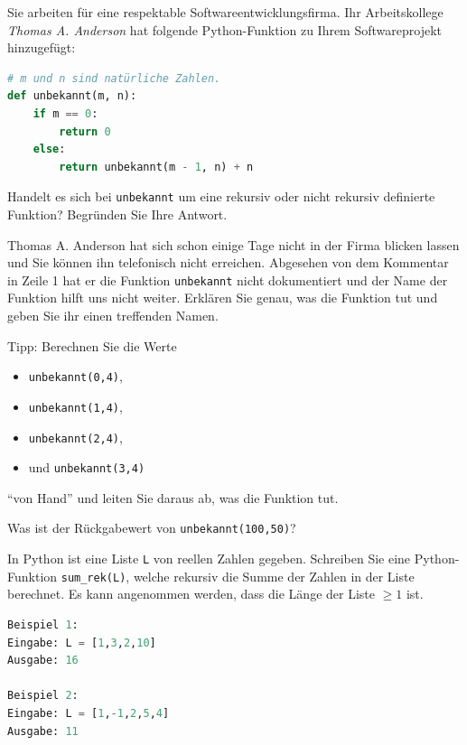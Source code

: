 \begin{myexercise}\label{myexercise:0304}
Sie arbeiten für eine respektable Softwareentwicklungsfirma. Ihr Arbeitskollege \textit{Thomas A. Anderson} hat folgende Python-Funktion zu Ihrem Softwareprojekt hinzugefügt:
\begin{lstlisting}[language=Python]
# m und n sind natürliche Zahlen.
def unbekannt(m, n):
    if m == 0:
        return 0
    else:
        return unbekannt(m - 1, n) + n
\end{lstlisting}
\begin{aenum}
    \item Handelt es sich bei \lstinline|unbekannt| um eine rekursiv oder nicht rekursiv definierte Funktion? Begründen Sie Ihre Antwort.
    \item Thomas A. Anderson hat sich schon einige Tage nicht in der Firma blicken lassen und Sie können ihn telefonisch nicht erreichen. Abgesehen von dem Kommentar in Zeile 1 hat er die Funktion \lstinline|unbekannt| nicht dokumentiert und der Name der Funktion hilft uns nicht weiter. Erklären Sie genau, was die Funktion tut und geben Sie ihr einen treffenden Namen.
    
    \noindent
    Tipp: Berechnen Sie die Werte
    \begin{itemize}
        \item \lstinline|unbekannt(0,4)|,
        \item \lstinline|unbekannt(1,4)|,
        \item \lstinline|unbekannt(2,4)|,
        \item und \lstinline|unbekannt(3,4)|
    \end{itemize}
    \enquote{von Hand} und leiten Sie daraus ab, was die Funktion tut.
    \item Was ist der Rückgabewert von \lstinline|unbekannt(100,50)|?
\end{aenum}
\end{myexercise}

\clearpage
\begin{myexercise}\label{myexercise:0305}
In Python ist eine Liste \lstinline|L| von reellen Zahlen gegeben. Schreiben Sie eine Python-Funktion \lstinline|sum_rek(L)|, welche rekursiv die Summe der Zahlen in der Liste berechnet. Es kann angenommen werden, dass die Länge der Liste $\geq 1$ ist.
\begin{lstlisting}[language=Python]
Beispiel 1:
Eingabe: L = [1,3,2,10]
Ausgabe: 16

Beispiel 2:
Eingabe: L = [1,-1,2,5,4]
Ausgabe: 11
\end{lstlisting}
\end{myexercise}

